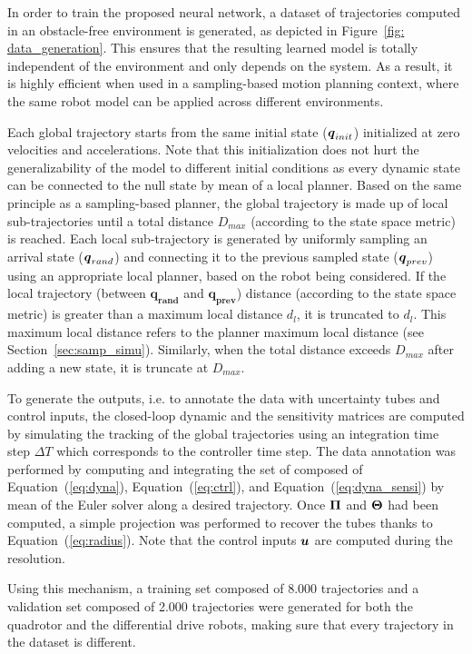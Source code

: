 In order to train the proposed neural network, a dataset of trajectories computed in an obstacle-free environment is generated, as depicted in Figure~\ref{fig: data_generation}.
This ensures that the resulting learned model is totally independent of the environment and only depends on the system.
As a result, it is highly efficient when used in a sampling-based motion planning context, where the same robot model can be applied across different environments.

Each global trajectory starts from the same initial state ($\boldsymbol{q}_{init}$) initialized at zero velocities and accelerations.
Note that this initialization does not hurt the generalizability of the model to different initial conditions as every dynamic state can be connected to the null state by mean of a local planner.
Based on the same principle as a sampling-based planner, the global trajectory is made up of local sub-trajectories until a total distance $D_{max}$ (according to the state space metric) is reached.
Each local sub-trajectory is generated by uniformly sampling an arrival state ($\boldsymbol{q}_{rand}$) and connecting it to the previous sampled state ($\boldsymbol{q}_{prev}$) using an appropriate local planner, based on the robot being considered.
If the local trajectory (between $\boldsymbol{q_{rand}}$ and $\boldsymbol{q_{prev}}$) distance (according to the state space metric) is greater than a maximum local distance $d_l$, it is truncated to $d_l$. 
This maximum local distance refers to the planner maximum local distance (see Section~\ref{sec:samp_simu}).
Similarly, when the total distance exceeds $D_{max}$ after adding a new state, it is truncate at $D_{max}$.

To generate the outputs, i.e. to annotate the data with uncertainty tubes and control inputs, the closed-loop dynamic and the sensitivity matrices are computed by simulating the tracking of the global trajectories using an integration time step $\Delta T$ which corresponds to the controller time step.
The data annotation was performed by computing and integrating the set of  composed of Equation~(\ref{eq:dyna}), Equation~(\ref{eq:ctrl}), and Equation~(\ref{eq:dyna_sensi}) by mean of the Euler  solver along a desired trajectory. 
Once $\boldsymbol{\Pi}$ and $\boldsymbol{\Theta}$ had been computed, a simple projection was performed to recover the tubes thanks to Equation~(\ref{eq:radius}).
Note that the control inputs $\boldsymbol{u}$ are computed during the  resolution.

Using this mechanism, a training set composed of 8.000 trajectories and a validation set composed of 2.000 trajectories were generated for both the quadrotor and the differential drive robots, making sure that every trajectory in the dataset is different.


